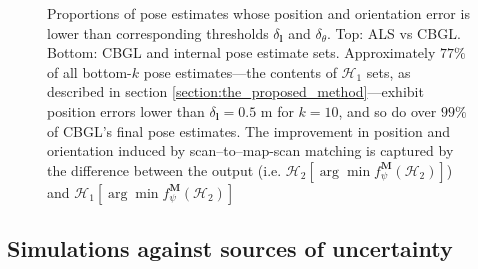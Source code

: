 \begin{figure}
  
  \vspace{0.01cm}
  \caption{\small Proportions of pose estimates whose position and orientation
           error is lower than corresponding thresholds $\delta_{\bm{l}}$ and
           $\delta_{\theta}$. Top: ALS vs CBGL. Bottom: CBGL and internal pose
           estimate sets.  Approximately $77\%$ of all bottom-$k$ pose
           estimates---the contents of $\mathcal{H}_1$ sets,
           as described in section \ref{section:the_proposed_method}---exhibit
           position errors lower than $\delta_{\bm{l}} = 0.5$ m for $k=10$, and
           so do over $99\%$ of CBGL's final pose estimates. The improvement in
           position and orientation induced by scan--to--map-scan matching is
           captured by the difference between the output (i.e.
           $\mathcal{H}_2[\arg \min f_{\psi}^{\bm{M}}(\mathcal{H}_2)]$) and
           $\mathcal{H}_1[\arg \min f_{\psi}^{\bm{M}}(\mathcal{H}_2)]$}
  \label{fig:a:awesomeness}
\end{figure}


\subsection{Simulations against sources of uncertainty}
\label{subsec:exp_b}

